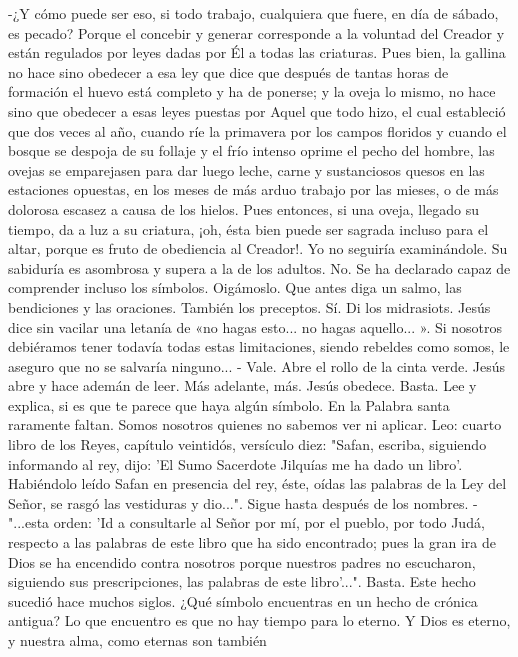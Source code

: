 \documentclass[12pt]{book} %
\begin{document}
-¿Y cómo puede ser eso, si todo trabajo, cualquiera que fuere, en día de sábado, es pecado? 
Porque el concebir y generar corresponde a la voluntad del Creador y están regulados por leyes dadas por Él a todas 
las criaturas. Pues bien, la gallina no hace sino obedecer a esa ley que dice que después de tantas horas de formación el huevo está completo y ha de ponerse; y la oveja lo mismo, no hace sino que obedecer a esas leyes puestas por Aquel que todo hizo, el cual estableció que dos veces al año, cuando ríe la primavera por los campos floridos y cuando el bosque se despoja de su follaje y el frío intenso oprime el pecho del hombre, las ovejas se emparejasen para dar luego leche, carne y sustanciosos quesos en las estaciones opuestas, en los meses de más arduo trabajo por las mieses, o de más dolorosa escasez a causa de los hielos. Pues entonces, si una oveja, llegado su tiempo, da a luz a su criatura, ¡oh, ésta bien puede ser sagrada incluso para el altar, porque es fruto de obediencia al Creador!.                
Yo no seguiría examinándole. Su sabiduría es asombrosa y supera a la de los adultos. 
No. Se ha declarado capaz de comprender incluso los símbolos. Oigámoslo. 
Que antes diga un salmo, las bendiciones y las oraciones. 
También los preceptos. 
Sí. Di los midrasiots. 
Jesús dice sin vacilar una letanía de «no hagas esto... no hagas aquello... ». Si nosotros debiéramos tener todavía todas 
estas limitaciones, siendo rebeldes como somos, le aseguro que no se salvaría ninguno... - Vale. Abre el rollo de la cinta verde. 
Jesús abre y hace ademán de leer. 
Más adelante, más. 
Jesús obedece. 
Basta. Lee y explica, si es que te parece que haya algún símbolo. 
En la Palabra santa raramente faltan. Somos nosotros quienes no sabemos ver ni aplicar. Leo: cuarto libro de los Reyes, capítulo veintidós, versículo diez: "Safan, escriba, siguiendo informando al rey, dijo: 'El Sumo Sacerdote Jilquías me ha dado un libro'. Habiéndolo leído Safan en presencia del rey, éste, oídas las palabras de la Ley del Señor, se rasgó las vestiduras y dio...". 
Sigue hasta después de los nombres. 
-"...esta orden: 'Id a consultarle al Señor por mí, por el pueblo, por todo Judá, respecto a las palabras de este libro que ha sido encontrado; pues la gran ira de Dios se ha encendido contra nosotros porque nuestros padres no escucharon, siguiendo sus prescripciones, las palabras de este libro'...". 
Basta. Este hecho sucedió hace muchos siglos. ¿Qué símbolo encuentras en un hecho de crónica antigua? 
Lo que encuentro es que no hay tiempo para lo eterno. Y Dios es eterno, y nuestra alma, como eternas son también 
\end{document}

